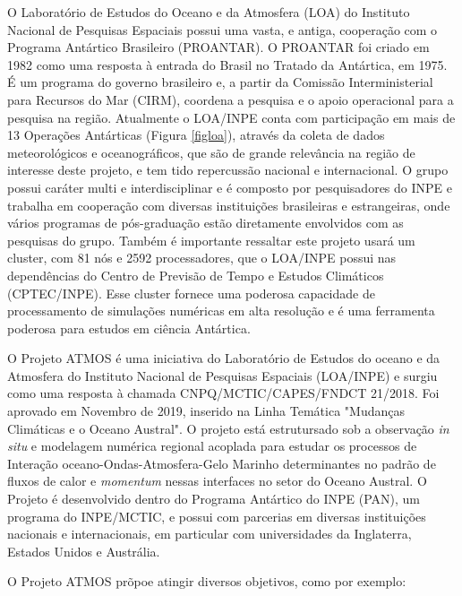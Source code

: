 \documentclass{article}
\begin{document}
O Laboratório de Estudos do Oceano e da Atmosfera (LOA) do Instituto Nacional de Pesquisas Espaciais possui uma vasta, e antiga, cooperação com o Programa 
Antártico Brasileiro (PROANTAR). O PROANTAR foi criado em 1982 como uma resposta à entrada do Brasil no Tratado da Antártica, em 1975. É um programa
do governo brasileiro e, a partir da Comissão Interministerial para Recursos do Mar (CIRM), coordena a pesquisa e o apoio operacional para a pesquisa
na região. Atualmente o LOA/INPE conta com participação em mais de 13 Operações Antárticas (\textcolor{bleu_cite}{Figura \ref{figloa}}), através da coleta 
de dados meteorológicos e oceanográficos, que são de grande relevância na região de interesse deste projeto, e tem tido repercussão nacional e internacional. 
O grupo possui caráter multi e interdisciplinar e é composto por pesquisadores do INPE e trabalha em cooperação com diversas instituições brasileiras e 
estrangeiras, onde vários  programas de pós-graduação estão diretamente envolvidos com as pesquisas do grupo. Também é importante ressaltar este projeto
usará um cluster, com 81 nós e 2592 processadores, que o LOA/INPE possui nas dependências do Centro de Previsão de Tempo e Estudos Climáticos (CPTEC/INPE). Esse cluster
fornece uma poderosa capacidade de processamento de simulações numéricas em alta resolução e é uma ferramenta poderosa para estudos em ciência Antártica.

O Projeto ATMOS é uma iniciativa do Laboratório de Estudos do oceano e da Atmosfera do Instituto Nacional de Pesquisas 
Espaciais (LOA/INPE) e surgiu como uma resposta à chamada CNPQ/MCTIC/CAPES/FNDCT 21/2018. Foi aprovado em Novembro de 2019, 
inserido na Linha Temática "Mudanças Climáticas e o Oceano Austral". O projeto está estrutursado sob a observação \textit{in situ} 
e modelagem numérica regional acoplada para estudar os processos de Interação oceano-Ondas-Atmosfera-Gelo Marinho determinantes 
no padrão de fluxos de calor e \textit{momentum} nessas interfaces no setor do Oceano Austral. O Projeto é desenvolvido dentro
do Programa Antártico do INPE (PAN), um programa do INPE/MCTIC, e possui com parcerias em diversas instituições nacionais e 
internacionais, em particular com universidades da Inglaterra, Estados Unidos e Austrália.

O Projeto ATMOS prõpoe atingir diversos objetivos, como por exemplo:
\end{document}
